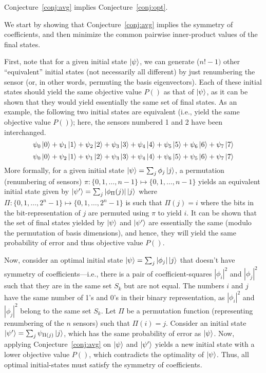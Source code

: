 \begin{thm-prf}
Conjecture~\ref{conj:avg} implies Conjecture~\ref{conj:opt}. 
\label{thm:final}
\end{thm-prf}

\begin{prf}
We start by showing that Conjecture~\ref{conj:avg} implies 
the symmetry of coefficients, and then minimize the common pairwise inner-product values of
the final states.

First, note that for a given initial state $\ket{\psi}$, we can generate ($n!-1)$ 
other ``equivalent'' initial states (not necessarily all different) by 
just renumbering the sensor (or, in other words, permuting the basis eigenvectors).
Each of these initial states should yield the same objective value $P()$ 
as that of $\ket{\psi}$, as it can be shown that they would 
yield essentially the same set of final states.
As an example, the following two initial states are  
equivalent (i.e., yield the same objective value $P()$); 
here, the sensors numbered 1 and 2 have been interchanged. 
$$\psi_0 \ket{0} +  \psi_1 \ket{1} + \psi_2 \ket{2} + \psi_3 \ket{3} +
\psi_4 \ket{4} + \psi_5 \ket{5} + \psi_6 \ket{6} + \psi_7 \ket{7}$$
$$\psi_0 \ket{0} +  \psi_2 \ket{1} + \psi_1 \ket{2} + \psi_3 \ket{3} +
\psi_4 \ket{4} + \psi_6 \ket{5} + \psi_5 \ket{6} + \psi_7 \ket{7}$$
More formally, for a given initial state $\ket{\psi} =  \sum_j \phi_j \ket{j}$, 
a permutation (renumbering of sensors) $\pi: \{0, 1, \ldots, n-1\} \mapsto \{0, 1, \ldots, n-1\}$ yields
an equivalent initial state given by
$\ket{\psi'} =  \sum_j |\phi_\Pi(j)| \ket{j}$ where $\Pi: \{0, 1, \ldots, 2^n-1\} \mapsto \{0, 1, \ldots, 2^n-1\}$ is 
such that $\Pi(j) = i$ where the bits in the bit-representation of $j$ are permuted using $\pi$ to yield $i$.
It can be shown that the set of final states yielded by $\ket{\psi}$ and $\ket{\psi'}$ 
are essentially the same (modulo the permutation of basis dimensions), 
and hence, they will yield the same probability of error and thus objective value $P()$.

Now, consider an optimal initial state $\ket{\psi} = \sum_j |\phi_j| \ket{j}$ 
that doesn't have symmetry of coefficients---i.e., there is a pair of 
coefficient-squares $|\phi_i|^2$ and $|\phi_j|^2$ such that
they are in the same set $S_k$ but are not equal.
The numbers $i$ and $j$ have the same number of 1's and 0's in their binary representation, 
as $|\phi_i|^2$ and $|\phi_j|^2$ belong to the same set $S_k$.
Let  $\Pi$ be a permutation function (representing renumbering of the $n$ sensors)
such that $\Pi(i) = j$. Consider an initial state 
$\ket{\psi'} = \sum_j \psi_{\Pi(j)} \ket{j}$, which has the same probability of 
error as $\ket{\psi}$. Now, applying Conjecture~\ref{conj:avg} on $\ket{\psi}$ and 
$\ket{\psi'}$ yields a new initial state with a lower objective value $P()$, which 
contradicts the optimality of $\ket{\psi}$. Thus, all optimal initial-states 
must satisfy the symmetry of coefficients. 



\end{prf}

